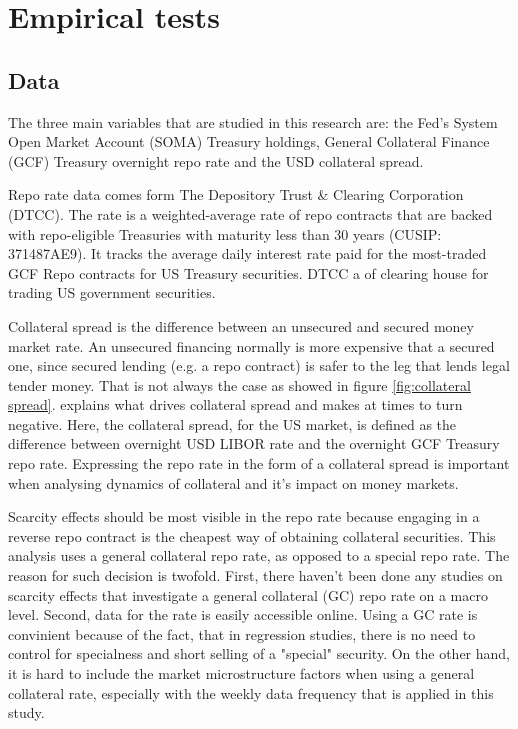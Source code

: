 \documentclass[11pt,a4paper,english,oneside]{article}
\begin{document}
\newpage
 
\section{Empirical tests} \label{sec:empirical}

\subsection{Data} \label{sec:data}

The three main variables that are studied in this research are: the Fed's System Open Market Account (SOMA) Treasury holdings, General Collateral Finance (GCF) Treasury overnight repo rate and the USD collateral spread.

Repo rate data comes form The Depository Trust \& Clearing Corporation (DTCC). The rate is a weighted-average rate of repo contracts that are backed with repo-eligible Treasuries with maturity less than 30 years (CUSIP: 371487AE9). It tracks the average daily interest rate paid for the most-traded GCF Repo contracts for US Treasury securities. DTCC a of clearing house for trading US government securities.

Collateral spread is the difference between an unsecured and secured money market rate. An unsecured financing normally is more expensive that a secured one, since secured lending (e.g. a repo contract) is safer to the leg that lends legal tender money. That is not always the case as showed in figure \ref{fig:collateral spread}. \citet{nyborg2019a} explains what drives collateral spread and makes at times to turn negative. Here, the collateral spread, for the US market, is defined as the difference between overnight USD LIBOR rate and the overnight GCF Treasury repo rate. Expressing the repo rate in the form of a collateral spread is important when analysing dynamics of collateral and it's impact on money markets. %

Scarcity effects should be most visible in the repo rate because engaging in a reverse repo contract is the cheapest way of obtaining collateral securities. This analysis uses a general collateral repo rate, as opposed to a special repo rate. The reason for such decision is twofold. First, there haven't been done any studies on scarcity effects that investigate a general collateral (GC) repo rate on a macro level. Second, data for the rate is easily accessible online. Using a GC rate is convinient because of the fact, that in regression studies, there is no need to control for specialness and short selling of a "special" security. On the other hand, it is hard to include the market microstructure factors when using a general collateral rate, especially with the weekly data frequency that is applied in this study.
\end{document}
